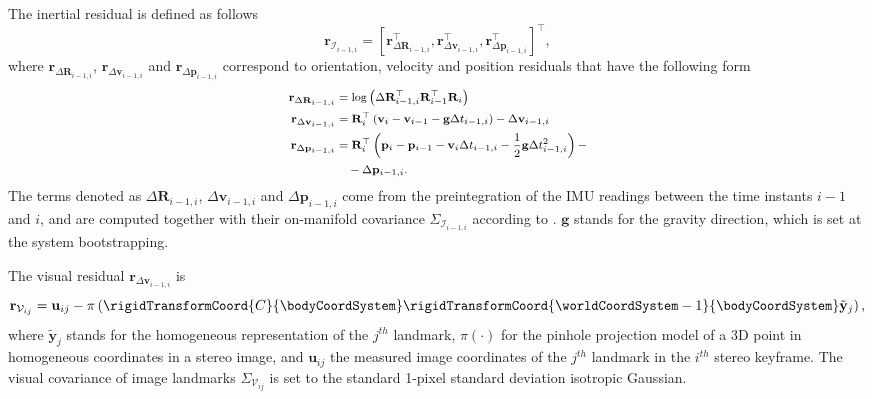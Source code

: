 The inertial residual is defined as follows
%
\begin{equation}
\mathbf{r}_{\mathcal{I}_{i-1,i}} = [\mathbf{r}_{\Delta \mathbf{R}_{i-1,i}}^\top, \mathbf{r}_{\Delta \mathbf{v}_{i-1,i}}^\top, \mathbf{r}_{\Delta \mathbf{p}_{i-1,i}}^\top]^{\top},
\end{equation}
%
where $\mathbf{r}_{\Delta \mathbf{R}_{i-1,i}}$, $\mathbf{r}_{\Delta \mathbf{v}_{i-1,i}}$ and $\mathbf{r}_{\Delta \mathbf{p}_{i-1,i}}$ correspond to orientation, velocity and position residuals that have the following form
%
\begin{equation}
\footnotesize
\begin{aligned}
\mathbf{r}_{\Delta \mathbf{R}_{i-1,i}} &= \log \left( \Delta \mathbf{R}_{i-1,i}^\top \mathbf{R}_{i-1}^\top \mathbf{R}_{i} \right) \\
\mathbf{r}_{\Delta \mathbf{v}_{i-1,i}} &= \mathbf{R}_{i}^\top \left( \mathbf{v}_{i} - \mathbf{v}_{i-1} - \mathbf{g}\Delta t_{i-1,i} \right) - \Delta \mathbf{v}_{i-1,i} \\
\mathbf{r}_{\Delta \mathbf{p}_{i-1,i}} &= \mathbf{R}_{i}^\top \left( \mathbf{p}_{i} - \mathbf{p}_{i-1} - \mathbf{v}_{i} \Delta t_{i-1,i} - \frac{1}{2}\mathbf{g}\Delta t_{i-1,i}^2 \right) - \\ & \ \ \ - \Delta \mathbf{p}_{i-1,i}.
\end{aligned}
\end{equation}
%
The terms denoted as $\Delta \mathbf{R}_{i-1,i}$, $\Delta \mathbf{v}_{i-1,i}$ and $\Delta \mathbf{p}_{i-1,i} $ come from the preintegration of the IMU readings between the time instants $i-1$ and $i$, and are computed together with their on-manifold covariance $\Sigma_{\mathcal{I}_{i-1,i}}$ according to \cite{forster2017onmanifold}. $\mathbf{g}$ stands for the gravity direction, which is set at the system bootstrapping.

The visual residual $\mathbf{r}_{\Delta \mathbf{v}_{i-1,i}}$ is
%
\begin{equation}
    \mathbf{r}_{\mathcal{V}_{ij}} = \mathbf{u}_{ij} - \pi\left( \rigidTransformCoord{C}{\bodyCoordSystem} \rigidTransformCoord{\worldCoordSystem-1}{\bodyCoordSystem} \tilde{\mathbf{y}}_{j} \right),
\end{equation}
%
where $ \tilde{\mathbf{y}}_{j}$ stands for the homogeneous representation of the $j^{th}$ landmark, $\pi(\cdot)$ for the pinhole projection model of a 3D point in homogeneous coordinates in a stereo image, and $\mathbf{u}_{ij}$ the measured image coordinates of the $j^{th}$ landmark in the $i^{th}$ stereo keyframe. The visual covariance of image landmarks $\Sigma_{\mathcal{V}_{ij}}$ is set to the standard 1-pixel standard deviation isotropic Gaussian.

